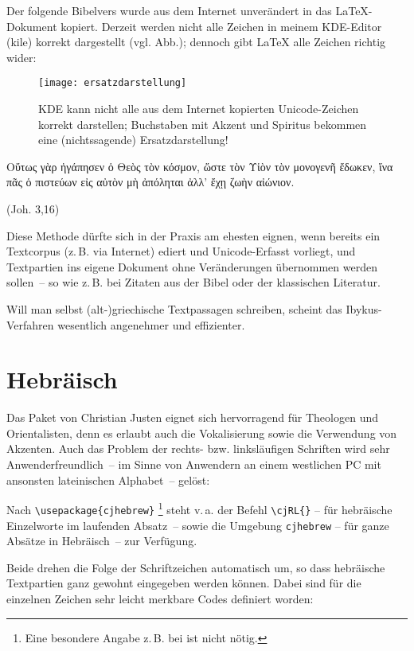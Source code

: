 Der folgende Bibelvers wurde aus dem Internet unverändert in das \LaTeX -Dokument
kopiert. Derzeit werden nicht alle Zeichen in meinem KDE-Editor (kile) korrekt dargestellt (vgl. Abb.);
dennoch gibt \LaTeX{} alle Zeichen richtig wider:

\begin{figure}
 \texttt{[image: ersatzdarstellung]}
 \caption{KDE kann nicht alle aus dem Internet kopierten Unicode-Zeichen korrekt darstellen;
 Buchstaben mit Akzent und Spiritus bekommen eine (nichtssagende) Ersatzdarstellung!}
\end{figure}


\begin{otherlanguage}{polutonikogreek}
Οὕτως γὰρ ἠγάπησεν ὁ Θεὸς τὸν κόσμον, ὥστε τὸν Υἱὸν τὸν μονογενῆ ἔδωκεν,
ἵνα πᾶς ὁ πιστεύων εἰς αὐτὸν μὴ ἀπόληται ἀλλ’ ἔχῃ ζωὴν αἰώνιον.
\end{otherlanguage}
(Joh. 3,16)

Diese Methode dürfte sich in der Praxis am ehesten eignen, wenn bereits ein Textcorpus
(z.\,B. via Internet) ediert und Unicode-Erfasst vorliegt, und Textpartien ins eigene Dokument
ohne Veränderungen übernommen werden sollen~-- so wie z.\,B. bei Zitaten aus der Bibel oder
der klassischen Literatur.

Will man selbst (alt-)griechische Textpassagen schreiben, scheint das Ibykus-Verfahren
wesentlich angenehmer und effizienter.


\section{Hebräisch}

Das Paket  von Christian Justen eignet sich hervorragend für
Theologen und Orientalisten, denn es erlaubt auch die Vokalisierung sowie die Verwendung
von Akzenten. Auch das Problem der rechts- bzw. linksläufigen Schriften wird sehr
Anwenderfreundlich~-- im Sinne von Anwendern an einem westlichen PC mit ansonsten
lateinischen Alphabet~-- gelöst:

Nach \lstinline/\usepackage{cjhebrew}/%
\footnote{Eine besondere Angabe z.\,B. bei  ist nicht nötig.}
steht v.\,a. der Befehl \lstinline/\cjRL{}/
-- für hebräische Einzelworte im laufenden Absatz~-- sowie die
Umgebung \lstinline/cjhebrew/
-- für ganze Absätze in Hebräisch~-- zur Verfügung.

Beide drehen die Folge der Schriftzeichen automatisch um, so dass hebräische Textpartien
ganz gewohnt eingegeben werden können. Dabei sind für die einzelnen Zeichen sehr leicht
merkbare Codes definiert worden:


